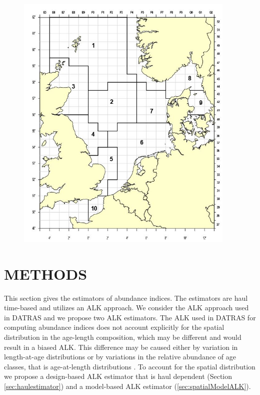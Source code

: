 \documentclass[a4paper 12pt]{article}
\numberwithin{equation}{section}
\begin{document}
\begin{figure}[h!]
  \centering
 {\includegraphics[width=10.5cm]{icesroundfishmap.jpg}}   
\end{figure}

\section{\large METHODS}
\label{sec:methods}
This section gives the estimators of abundance indices. The estimators are haul time-based and utilizes an ALK approach. We consider the ALK approach used in DATRAS and we propose two ALK estimators. The ALK used in DATRAS for computing abundance indices does not account explicitly for the spatial distribution in the age-length composition, which may be different and would result in a biased ALK. This difference may be caused either by variation in length-at-age distributions or by variations in the relative abundance of age classes, that is age-at-length distributions \citep{gerritsen2006simple}.  To account for the spatial distribution we propose a design-based ALK estimator that is haul dependent (Section \ref{sec:haulestimator}) and a model-based ALK estimator (\ref{sec:spatialModelALK}).
\end{document}

